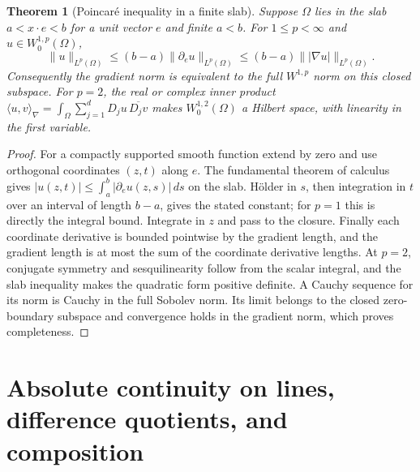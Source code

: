 \documentclass[11pt,oneside,openany]{book}
\newtheorem{theorem}{Theorem}[chapter]
\theoremstyle{definition}
\theoremstyle{remark}
\begin{document}
\begin{theorem}[Poincar\'e inequality in a finite slab]
\label{p102:AN-11-C04-S01}
Suppose \(\Omega\) lies in the slab \(a<x\cdot e<b\) for a unit vector \(e\) and finite \(a<b\). For \(1\leq p<\infty\) and \(u\in W_0^{1,p}(\Omega)\),
\[
 \|u\|_{L^p(\Omega)}\leq (b-a)\|\partial_e u\|_{L^p(\Omega)}
 \leq (b-a)\big\||\nabla u|\big\|_{L^p(\Omega)}.
\]
Consequently the gradient norm is equivalent to the full \(W^{1,p}\) norm on this closed subspace. For \(p=2\), the real or complex inner product \(\langle u,v\rangle_\nabla=\int_\Omega\sum_{j=1}^d D_ju\,\overline{D_jv}\) makes \(W_0^{1,2}(\Omega)\) a Hilbert space, with linearity in the first variable.
\end{theorem}
\begin{proof}
For a compactly supported smooth function extend by zero and use orthogonal coordinates \((z,t)\) along \(e\). The fundamental theorem of calculus gives \(|u(z,t)|\leq\int_a^b|\partial_eu(z,s)|\,ds\) on the slab. H\"older in \(s\), then integration in \(t\) over an interval of length \(b-a\), gives the stated constant; for \(p=1\) this is directly the integral bound. Integrate in \(z\) and pass to the closure. Finally each coordinate derivative is bounded pointwise by the gradient length, and the gradient length is at most the sum of the coordinate derivative lengths. At \(p=2\), conjugate symmetry and sesquilinearity follow from the scalar integral, and the slab inequality makes the quadratic form positive definite. A Cauchy sequence for its norm is Cauchy in the full Sobolev norm. Its limit belongs to the closed zero-boundary subspace and convergence holds in the gradient norm, which proves completeness.
\end{proof}

\section{Absolute continuity on lines, difference quotients, and composition}
\end{document}

